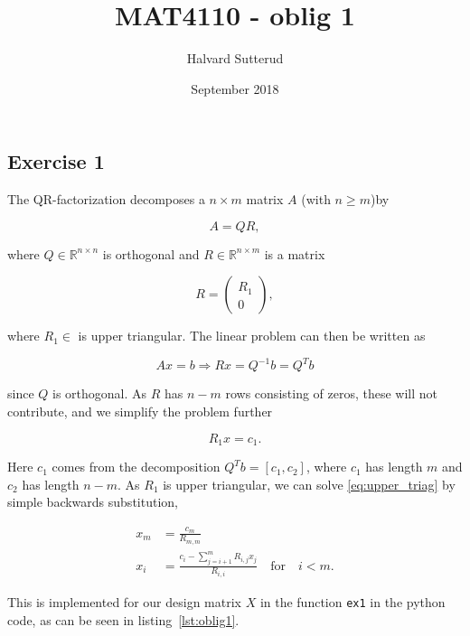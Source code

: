\documentclass[a11paper, 10pt]{article}
\title{MAT4110 - oblig 1}
\author{Halvard Sutterud }
\date{September 2018}
\begin{document}
\maketitle

\subsection*{Exercise 1}
The QR-factorization decomposes a $n\times m$ matrix $A$ (with $n \geq m$)by

\begin{equation}
    A = QR,
\end{equation}

where $Q \in \mathbb{R}^{n \times n}$ is orthogonal and $R \in \mathbb{R}^{n\times m}$
is a matrix 

\begin{equation}
    R = \begin{pmatrix}
        R_1 \\ 0
    \end{pmatrix},
\end{equation}

where $R_1 \in \mathbb{}$ is upper triangular. The linear problem can then
be written as 

\begin{equation}
    Ax = b \Rightarrow Rx = Q^{-1}b = Q^Tb
\end{equation}

since $Q$ is orthogonal. As $R$ has $n-m$ rows consisting of zeros, these
will not contribute, and we simplify the problem further

\begin{equation} \label{eq:upper_triag}
    R_1 x =  c_1.%
\end{equation}

Here $c_1$ comes from the decomposition $Q^Tb = [c_1, c_2]$, where $c_1$
has length $m$ and $c_2$ has length $n-m$. As $R_1$ is upper triangular, we
can solve \cref{eq:upper_triag} by simple backwards substitution, 

\begin{align*}
    x_m &= \frac{c_m}{R_{m,m}}\\
    x_i &= \frac{c_i - \sum_{j=i+1}^{m} R_{i,j} x_j}{R_{i,i}} \quad \text{for}\quad i <
    m.
\end{align*}

This is implemented for our design matrix $X$ in the function \texttt{ex1}
in the python code, as can be seen in listing~\ref{lst:oblig1}. 
\end{document}
